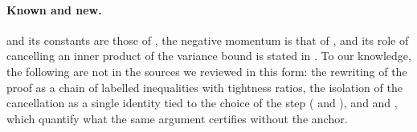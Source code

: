 \paragraph{Known and new.}
 and its constants are those of \cite{kovalev2020dont}, the negative momentum is that of
\cite{allenzhu2018katyusha}, and its role of cancelling an inner product of the variance bound is stated in
\cite{allenzhu2018katyusha,zhou2019direct}. To our knowledge, the following are not in the sources we reviewed in this
form: the rewriting of the proof as a chain of labelled inequalities with tightness ratios, the isolation of the
cancellation as a single identity tied to the choice of the step ( and ),
and  and , which quantify what the same argument certifies without the
anchor.

